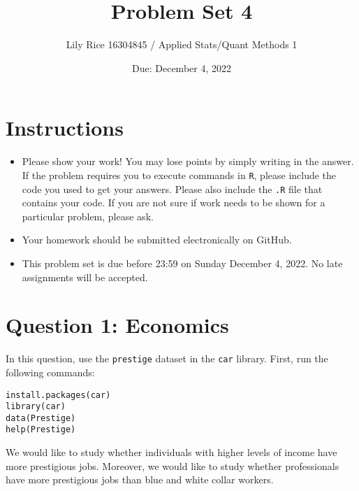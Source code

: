 \documentclass[12pt,letterpaper]{article}
\title{Problem Set 4}
\date{Due: December 4, 2022}
\author{Lily Rice 16304845 / Applied Stats/Quant Methods 1}
\begin{document}
	\maketitle
	\section*{Instructions}
	\begin{itemize}
		\item Please show your work! You may lose points by simply writing in the answer. If the problem requires you to execute commands in \texttt{R}, please include the code you used to get your answers. Please also include the \texttt{.R} file that contains your code. If you are not sure if work needs to be shown for a particular problem, please ask.
		\item Your homework should be submitted electronically on GitHub.
		\item This problem set is due before 23:59 on Sunday December 4, 2022. No late assignments will be accepted.
	\end{itemize}



	\vspace{.5cm}
\section*{Question 1: Economics}
\vspace{.25cm}
\noindent 	
In this question, use the \texttt{prestige} dataset in the \texttt{car} library. First, run the following commands:

\begin{verbatim}
install.packages(car)
library(car)
data(Prestige)
help(Prestige)
\end{verbatim} 


\noindent We would like to study whether individuals with higher levels of income have more prestigious jobs. Moreover, we would like to study whether professionals have more prestigious jobs than blue and white collar workers.
\end{document}
